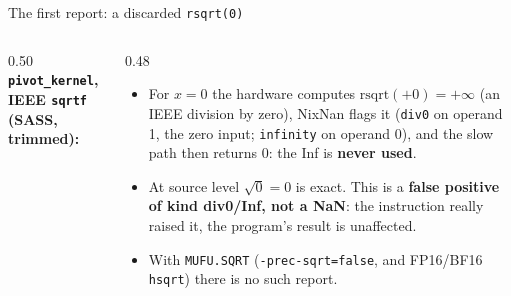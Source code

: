 \documentclass[aspectratio=169,10pt,xcolor=table]{beamer}
\begin{document}
\begin{frame}[fragile]{The first report: a discarded \texttt{rsqrt(0)}}
\scriptsize
\begin{columns}[T]\begin{column}{0.50\textwidth}
\textbf{\texttt{pivot\_kernel}, IEEE \texttt{sqrtf} (SASS, trimmed):}\\[1mm]
\end{column}\begin{column}{0.48\textwidth}
\footnotesize
\begin{itemize}
\item For $x=0$ the hardware computes $\mathrm{rsqrt}(+0)=+\infty$ (an IEEE division by zero), NixNan flags it (\texttt{div0} on operand 1, the zero input; \texttt{infinity} on operand 0), and the slow path then returns $0$: the Inf is \textbf{never used}.
\item At source level $\sqrt0=0$ is exact. This is a \textbf{false positive of kind div0/Inf, not a NaN}: the instruction really raised it, the program's result is unaffected.
\item With \texttt{MUFU.SQRT} (\texttt{-prec-sqrt=false}, and FP16/BF16 \texttt{hsqrt}) there is no such report.
\end{itemize}
\end{column}\end{columns}


\end{frame}
\end{document}
